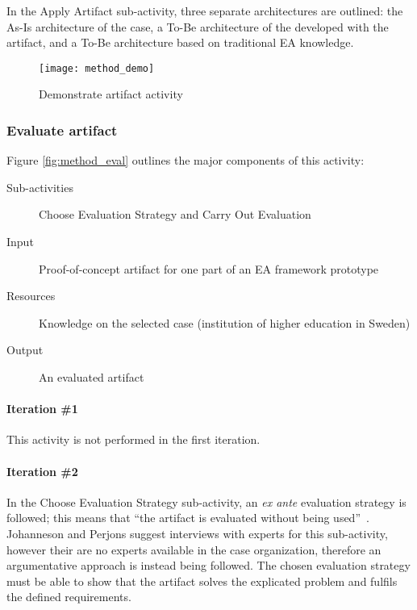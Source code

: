 In the Apply Artifact sub-activity, three separate architectures are outlined: the As-Is architecture of the case, a To-Be architecture of the developed with the artifact, and a To-Be architecture based on traditional EA knowledge. 

\begin{figure}
\texttt{[image: method\_demo]}
\caption{Demonstrate artifact activity}
\label{fig:method_demo}
\end{figure}

\subsubsection*{Evaluate artifact}

Figure \ref{fig:method_eval} outlines the major components of this activity:
\begin{description}
  \item[Sub-activities] Choose Evaluation Strategy and Carry Out Evaluation~\cite[Ch. 8]{johannessonPerjons2012}
  \item[Input] Proof-of-concept artifact for one part of an EA framework prototype
  \item[Resources]  Knowledge on the selected case (institution of higher education in Sweden)
  \item[Output] An evaluated artifact
\end{description}

\paragraph{Iteration \#1}

This activity is not performed in the first iteration. 

\paragraph{Iteration \#2}

In the Choose Evaluation Strategy sub-activity, an \textit{ex ante} evaluation strategy is followed; this means that ``the artifact is evaluated without being used''~\cite[Ch. 9.1]{johannessonPerjons2012}. Johanneson and Perjons suggest interviews with experts for this sub-activity, however their are no experts available in the case organization, therefore an argumentative approach is instead being followed. The chosen evaluation strategy must be able to show that the artifact solves the explicated problem and fulfils the defined requirements.

